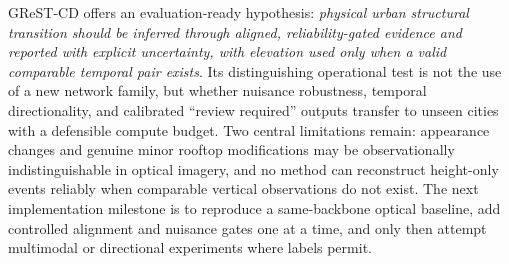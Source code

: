 GReST-CD offers an evaluation-ready hypothesis: \emph{physical urban structural transition should be inferred through aligned, reliability-gated evidence and reported with explicit uncertainty, with elevation used only when a valid comparable temporal pair exists}. Its distinguishing operational test is not the use of a new network family, but whether nuisance robustness, temporal directionality, and calibrated ``review required'' outputs transfer to unseen cities with a defensible compute budget. Two central limitations remain: appearance changes and genuine minor rooftop modifications may be observationally indistinguishable in optical imagery, and no method can reconstruct height-only events reliably when comparable vertical observations do not exist. The next implementation milestone is to reproduce a same-backbone optical baseline, add controlled alignment and nuisance gates one at a time, and only then attempt multimodal or directional experiments where labels permit.

